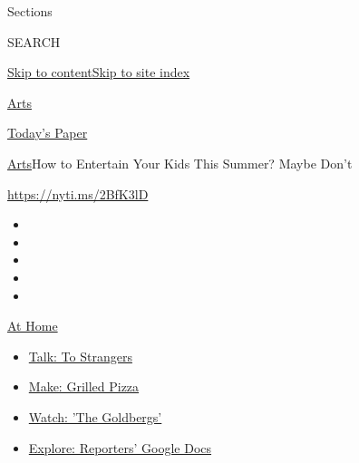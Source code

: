 Sections

SEARCH

\protect\hyperlink{site-content}{Skip to
content}\protect\hyperlink{site-index}{Skip to site index}

\href{https://www.nytimes3xbfgragh.onion/section/arts}{Arts}

\href{https://myaccount.nytimes3xbfgragh.onion/auth/login?response_type=cookie\&client_id=vi}{}

\href{https://www.nytimes3xbfgragh.onion/section/todayspaper}{Today's
Paper}

\href{/section/arts}{Arts}\textbar{}How to Entertain Your Kids This
Summer? Maybe Don't

\url{https://nyti.ms/2BfK3lD}

\begin{itemize}
\item
\item
\item
\item
\item
\end{itemize}

\href{https://www.nytimes3xbfgragh.onion/spotlight/at-home?action=click\&pgtype=Article\&state=default\&region=TOP_BANNER\&context=at_home_menu}{At
Home}

\begin{itemize}
\tightlist
\item
  \href{https://www.nytimes3xbfgragh.onion/2020/08/03/well/family/the-benefits-of-talking-to-strangers.html?action=click\&pgtype=Article\&state=default\&region=TOP_BANNER\&context=at_home_menu}{Talk:
  To Strangers}
\item
  \href{https://www.nytimes3xbfgragh.onion/2020/08/01/at-home/coronavirus-make-pizza-on-a-grill.html?action=click\&pgtype=Article\&state=default\&region=TOP_BANNER\&context=at_home_menu}{Make:
  Grilled Pizza}
\item
  \href{https://www.nytimes3xbfgragh.onion/2020/07/31/arts/television/goldbergs-abc-stream.html?action=click\&pgtype=Article\&state=default\&region=TOP_BANNER\&context=at_home_menu}{Watch:
  'The Goldbergs'}
\item
  \href{https://www.nytimes3xbfgragh.onion/interactive/2020/at-home/even-more-reporters-editors-diaries-lists-recommendations.html?action=click\&pgtype=Article\&state=default\&region=TOP_BANNER\&context=at_home_menu}{Explore:
  Reporters' Google Docs}
\end{itemize}

